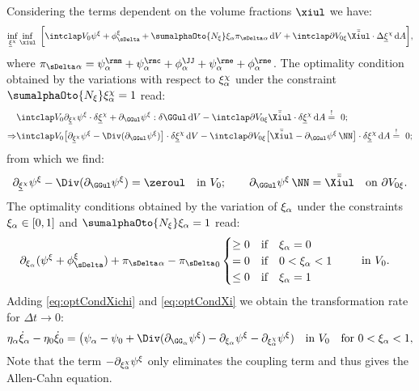   Considering the terms dependent on the volume fractions $\xiul$ we have:
  \begin{align}
    \inf_{\xichiul}\inf_{\xiul} \ \bigg[ \intVO  \psixi + \phixiDelta + \sumalphaOto{\Nxi} \xia\piDeltaa \dV + \intdVOx{\xi} \bar{\tilde\Xiul}\cdot \Delta\xichiul \dA \bigg],
    \label{eq:optxi}
  \end{align}
  where $\piDeltaa = \psima + \psica + \phiJJa + \psiea + \phiea$. The optimality condition obtained by the variations with respect to $\xi^{\chi}_{\alpha}$ under the constraint $\sumalphaOto{\Nxi}\xichia=1$ read:
  \begin{align}
    \begin{aligned}
    & \intVO\dxichiul\psixi\cdot\delta\xichiul+\dGGul\psixi : \delta\GGul \dV - \intdVOx{\xi} \bar{\tilde\Xiul}\cdot \delta\xichiul \dA  \stackrel{!}{=} \ 0;  \\
    \Rightarrow & \intVO \big[\dxichiul\psixi - \Div(\dGGul\psixi)\big]\cdot\delta\xichiul \dV - \intdVOx{\xi} \big[ \bar{\tilde\Xiul} - \dGGul\psixi \, \NN \big] \cdot \delta\xichiul \dA  \stackrel{!}{=} \ 0;
    \end{aligned}
  \end{align}
  from which we find:
  \begin{align}
    \dxichiul\psixi - \Div(\dGGul\psixi) = \zeroul \quad \text{in } V_0; \qquad \dGGul\psixi\,\NN=\bar\Xiultilde \quad \text{on } \partial V_{0\xi} .
    \label{eq:optCondXichi}
  \end{align}
  The optimality conditions obtained by the variation of $\xi_\alpha$ under the constraints $\xi_\alpha \in [0,1]$ and $\sumalphaOto{\Nxi}\xia=1$ read:
  \begin{align}
    & \dxia(\psixi+\phixiDelta)+\piDeltaa-{\piDelta}_{0} \begin{cases} \geq 0 \quad \text{if} \quad \xia = 0  \\ = 0 \quad \text{if} \quad 0<\xia<1 \\ \leq 0 \quad \text{if} \quad  \xia = 1 \end{cases} \quad \text{ in } V_0.
    \label{eq:optCondXi}
  \end{align}
  Adding \cref{eq:optCondXichi} and \cref{eq:optCondXi} we obtain the transformation rate for $\Delta t \rightarrow 0$:
  \begin{align}
    \etaa\xiadot-\eta_0\dot\xi_0 = \big( \psi_\alpha-\psi_0 + \Div(\dGGa\psixi) - \dxia\psixi - \dxichia\psixi) \quad \text{in } V_0 \quad \text{for } 0<\xia<1,
  \end{align} 
 Note that the term $-\partial_{\xi^{\chi}_{\alpha}}\psi^{\xi}$ only eliminates the coupling term and thus gives the Allen-Cahn equation. 


